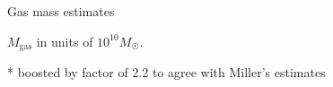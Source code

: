 \documentclass[11pt, oneside]{article}   	%
\begin{document}
{\huge Gas mass estimates}

\vspace{2em}
{$M_\text{gas}$ in units of $10^{10} M_{\astrosun}$.}
\vspace{1em}



\vspace{1em}
* boosted by factor of 2.2 to agree with Miller's estimates
\end{document}
